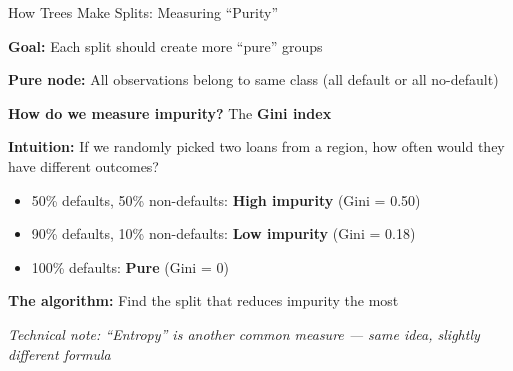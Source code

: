 \documentclass[10pt]{beamer}
\newcommand{\highlight}[1]{\textcolor{AccentOrange}{\textbf{#1}}}
\begin{document}
\begin{frame}{How Trees Make Splits: Measuring ``Purity''}

  \textbf{Goal:} Each split should create more ``pure'' groups

  \vspace{0.5em}
  \textbf{Pure node:} All observations belong to same class (all default or all no-default)

  \vspace{1em}
  \textbf{How do we measure impurity?} The \highlight{Gini index}

  \vspace{0.5em}
  \textbf{Intuition:} If we randomly picked two loans from a region, how often would they have different outcomes?

  \vspace{0.5em}
  \begin{itemize}
    \item 50\% defaults, 50\% non-defaults: \highlight{High impurity} (Gini = 0.50)
    \item 90\% defaults, 10\% non-defaults: \highlight{Low impurity} (Gini = 0.18)
    \item 100\% defaults: \highlight{Pure} (Gini = 0)
  \end{itemize}

  \vspace{1em}
  \textbf{The algorithm:} Find the split that reduces impurity the most

  \vspace{0.5em}
  \textit{Technical note: ``Entropy'' is another common measure --- same idea, slightly different formula}
\end{frame}

\end{document}
